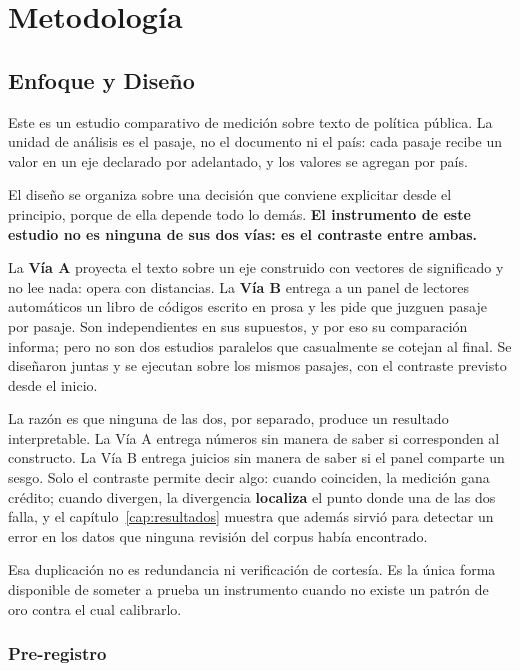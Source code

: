 
\chapter{Metodología}
\label{cap:metodologia}

\section{Enfoque y Diseño}

Este es un estudio comparativo de medición sobre texto de política pública. La unidad de análisis es el pasaje, no el documento ni el país: cada pasaje recibe un valor en un eje declarado por adelantado, y los valores se agregan por país.

El diseño se organiza sobre una decisión que conviene explicitar desde el principio, porque de ella depende todo lo demás. \textbf{El instrumento de este estudio no es ninguna de sus dos vías: es el contraste entre ambas.}

La \textbf{Vía A} proyecta el texto sobre un eje construido con vectores de significado y no lee nada: opera con distancias. La \textbf{Vía B} entrega a un panel de lectores automáticos un libro de códigos escrito en prosa y les pide que juzguen pasaje por pasaje. Son independientes en sus supuestos, y por eso su comparación informa; pero no son dos estudios paralelos que casualmente se cotejan al final. Se diseñaron juntas y se ejecutan sobre los mismos pasajes, con el contraste previsto desde el inicio.

La razón es que ninguna de las dos, por separado, produce un resultado interpretable. La Vía A entrega números sin manera de saber si corresponden al constructo. La Vía B entrega juicios sin manera de saber si el panel comparte un sesgo. Solo el contraste permite decir algo: cuando coinciden, la medición gana crédito; cuando divergen, la divergencia \textbf{localiza} el punto donde una de las dos falla, y el capítulo~\ref{cap:resultados} muestra que además sirvió para detectar un error en los datos que ninguna revisión del corpus había encontrado.

Esa duplicación no es redundancia ni verificación de cortesía. Es la única forma disponible de someter a prueba un instrumento cuando no existe un patrón de oro contra el cual calibrarlo.

\subsection{Pre-registro}

